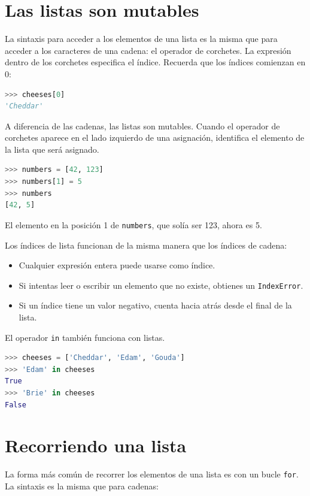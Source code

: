\section{Las listas son mutables}

La sintaxis para acceder a los elementos de una lista es la misma que para acceder a los caracteres de una cadena: el operador de corchetes. La expresión dentro de los corchetes especifica el índice. Recuerda que los índices comienzan en 0:

\begin{lstlisting}[language=Python]
>>> cheeses[0] 
'Cheddar'
\end{lstlisting}

A diferencia de las cadenas, las listas son mutables. Cuando el operador de corchetes aparece en el lado izquierdo de una asignación, identifica el elemento de la lista que será asignado.

\begin{lstlisting}[language=Python]
>>> numbers = [42, 123] 
>>> numbers[1] = 5 
>>> numbers 
[42, 5]
\end{lstlisting}

El elemento en la posición 1 de \texttt{numbers}, que solía ser 123, ahora es 5.

Los índices de lista funcionan de la misma manera que los índices de cadena:

\begin{itemize}
    \item Cualquier expresión entera puede usarse como índice.
    \item Si intentas leer o escribir un elemento que no existe, obtienes un \texttt{IndexError}.
    \item Si un índice tiene un valor negativo, cuenta hacia atrás desde el final de la lista.
\end{itemize}

El operador \texttt{in} también funciona con listas.

\begin{lstlisting}[language=Python]
>>> cheeses = ['Cheddar', 'Edam', 'Gouda'] 
>>> 'Edam' in cheeses 
True 
>>> 'Brie' in cheeses 
False
\end{lstlisting}

\section{Recorriendo una lista}

La forma más común de recorrer los elementos de una lista es con un bucle \texttt{for}. La sintaxis es la misma que para cadenas:

